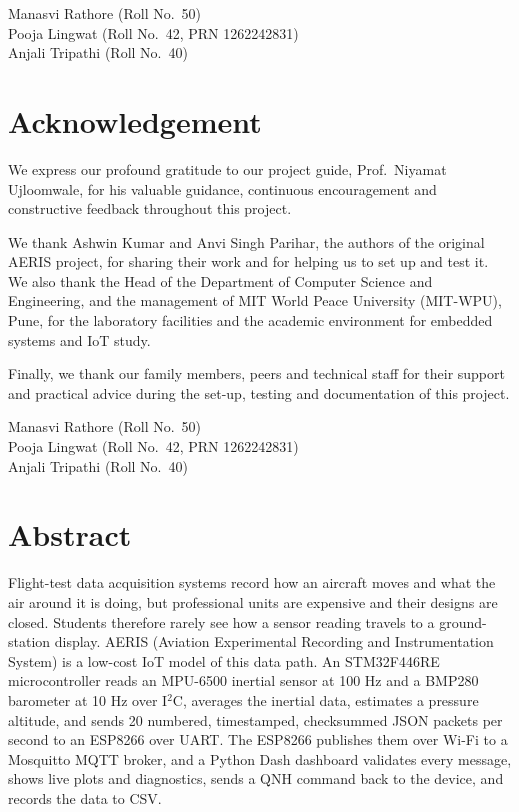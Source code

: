 \documentclass[12pt,a4paper]{report}
\newcommand{\studentnames}{Manasvi Rathore (Roll No.\ 50)\\Pooja Lingwat (Roll No.\ 42, PRN 1262242831)\\Anjali Tripathi (Roll No.\ 40)}
\newcommand{\guidename}{Prof.\ Niyamat Ujloomwale}
\newcommand{\department}{Department of Computer Science and Engineering}
\newcommand{\universityname}{MIT World Peace University (MIT-WPU), Pune}
\begin{document}
\vspace{1.5cm}
\begin{flushright}
\studentnames
\end{flushright}

\chapter*{Acknowledgement}
We express our profound gratitude to our project guide, \guidename, for his valuable guidance, continuous encouragement and constructive feedback throughout this project.

We thank Ashwin Kumar and Anvi Singh Parihar, the authors of the original AERIS project, for sharing their work and for helping us to set up and test it. We also thank the Head of the \department, and the management of \universityname, for the laboratory facilities and the academic environment for embedded systems and IoT study.

Finally, we thank our family members, peers and technical staff for their support and practical advice during the set-up, testing and documentation of this project.

\vspace{1.5cm}
\begin{flushright}
\studentnames
\end{flushright}

\chapter*{Abstract}
Flight-test data acquisition systems record how an aircraft moves and what the air around it is doing, but professional units are expensive and their designs are closed. Students therefore rarely see how a sensor reading travels to a ground-station display. AERIS (Aviation Experimental Recording and Instrumentation System) is a low-cost IoT model of this data path. An STM32F446RE microcontroller reads an MPU-6500 inertial sensor at 100 Hz and a BMP280 barometer at 10 Hz over I$^2$C, averages the inertial data, estimates a pressure altitude, and sends 20 numbered, timestamped, checksummed JSON packets per second to an ESP8266 over UART. The ESP8266 publishes them over Wi-Fi to a Mosquitto MQTT broker, and a Python Dash dashboard validates every message, shows live plots and diagnostics, sends a QNH command back to the device, and records the data to CSV.
\end{document}
